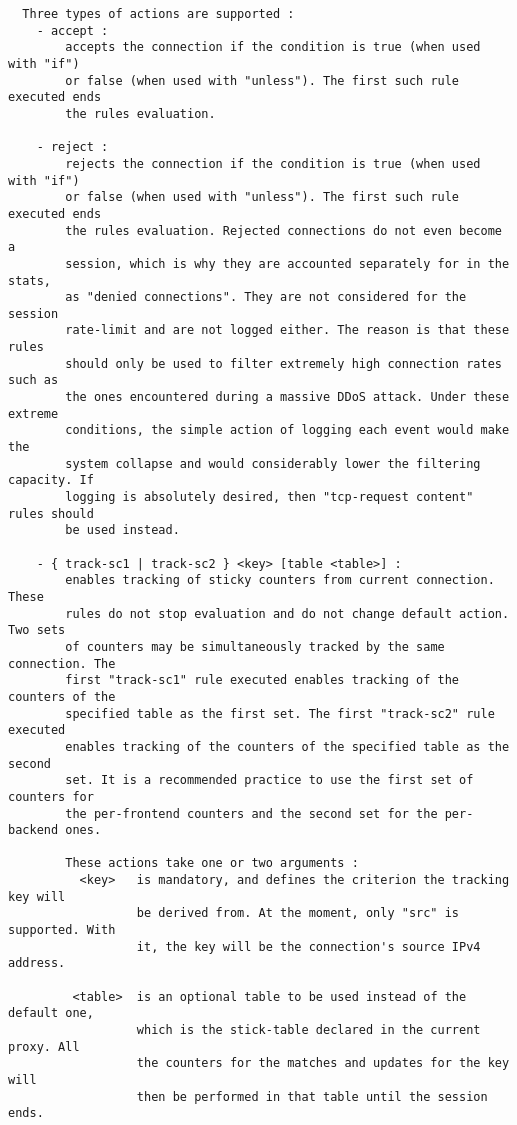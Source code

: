 \begin{verbatim}
  Three types of actions are supported :
    - accept :
        accepts the connection if the condition is true (when used with "if")
        or false (when used with "unless"). The first such rule executed ends
        the rules evaluation.

    - reject :
        rejects the connection if the condition is true (when used with "if")
        or false (when used with "unless"). The first such rule executed ends
        the rules evaluation. Rejected connections do not even become a
        session, which is why they are accounted separately for in the stats,
        as "denied connections". They are not considered for the session
        rate-limit and are not logged either. The reason is that these rules
        should only be used to filter extremely high connection rates such as
        the ones encountered during a massive DDoS attack. Under these extreme
        conditions, the simple action of logging each event would make the
        system collapse and would considerably lower the filtering capacity. If
        logging is absolutely desired, then "tcp-request content" rules should
        be used instead.

    - { track-sc1 | track-sc2 } <key> [table <table>] :
        enables tracking of sticky counters from current connection. These
        rules do not stop evaluation and do not change default action. Two sets
        of counters may be simultaneously tracked by the same connection. The
        first "track-sc1" rule executed enables tracking of the counters of the
        specified table as the first set. The first "track-sc2" rule executed
        enables tracking of the counters of the specified table as the second
        set. It is a recommended practice to use the first set of counters for
        the per-frontend counters and the second set for the per-backend ones.

        These actions take one or two arguments :
          <key>   is mandatory, and defines the criterion the tracking key will
                  be derived from. At the moment, only "src" is supported. With
                  it, the key will be the connection's source IPv4 address.

         <table>  is an optional table to be used instead of the default one,
                  which is the stick-table declared in the current proxy. All
                  the counters for the matches and updates for the key will
                  then be performed in that table until the session ends.


\end{verbatim}

